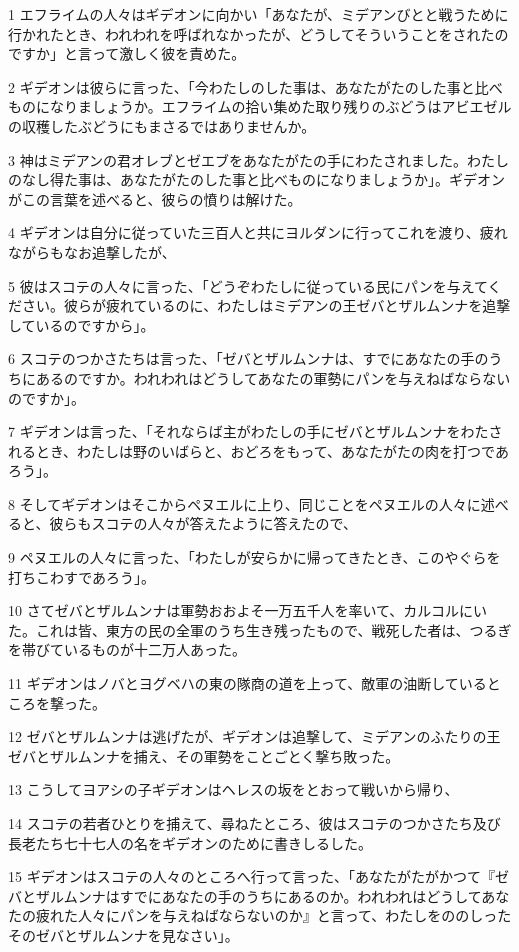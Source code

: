 \par 1 エフライムの人々はギデオンに向かい「あなたが、ミデアンびとと戦うために行かれたとき、われわれを呼ばれなかったが、どうしてそういうことをされたのですか」と言って激しく彼を責めた。
\par 2 ギデオンは彼らに言った、「今わたしのした事は、あなたがたのした事と比べものになりましょうか。エフライムの拾い集めた取り残りのぶどうはアビエゼルの収穫したぶどうにもまさるではありませんか。
\par 3 神はミデアンの君オレブとゼエブをあなたがたの手にわたされました。わたしのなし得た事は、あなたがたのした事と比べものになりましょうか」。ギデオンがこの言葉を述べると、彼らの憤りは解けた。
\par 4 ギデオンは自分に従っていた三百人と共にヨルダンに行ってこれを渡り、疲れながらもなお追撃したが、
\par 5 彼はスコテの人々に言った、「どうぞわたしに従っている民にパンを与えてください。彼らが疲れているのに、わたしはミデアンの王ゼバとザルムンナを追撃しているのですから」。
\par 6 スコテのつかさたちは言った、「ゼバとザルムンナは、すでにあなたの手のうちにあるのですか。われわれはどうしてあなたの軍勢にパンを与えねばならないのですか」。
\par 7 ギデオンは言った、「それならば主がわたしの手にゼバとザルムンナをわたされるとき、わたしは野のいばらと、おどろをもって、あなたがたの肉を打つであろう」。
\par 8 そしてギデオンはそこからペヌエルに上り、同じことをペヌエルの人々に述べると、彼らもスコテの人々が答えたように答えたので、
\par 9 ペヌエルの人々に言った、「わたしが安らかに帰ってきたとき、このやぐらを打ちこわすであろう」。
\par 10 さてゼバとザルムンナは軍勢おおよそ一万五千人を率いて、カルコルにいた。これは皆、東方の民の全軍のうち生き残ったもので、戦死した者は、つるぎを帯びているものが十二万人あった。
\par 11 ギデオンはノバとヨグベハの東の隊商の道を上って、敵軍の油断しているところを撃った。
\par 12 ゼバとザルムンナは逃げたが、ギデオンは追撃して、ミデアンのふたりの王ゼバとザルムンナを捕え、その軍勢をことごとく撃ち敗った。
\par 13 こうしてヨアシの子ギデオンはヘレスの坂をとおって戦いから帰り、
\par 14 スコテの若者ひとりを捕えて、尋ねたところ、彼はスコテのつかさたち及び長老たち七十七人の名をギデオンのために書きしるした。
\par 15 ギデオンはスコテの人々のところへ行って言った、「あなたがたがかつて『ゼバとザルムンナはすでにあなたの手のうちにあるのか。われわれはどうしてあなたの疲れた人々にパンを与えねばならないのか』と言って、わたしをののしったそのゼバとザルムンナを見なさい」。

